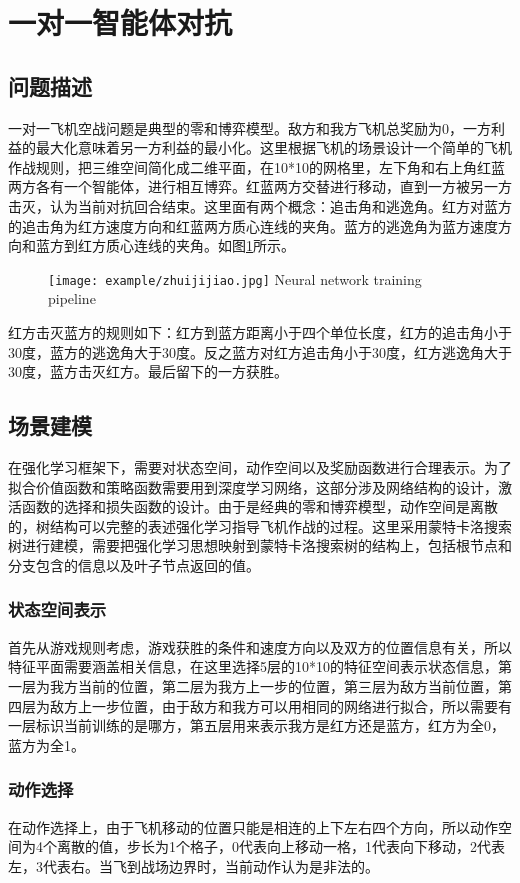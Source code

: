 \section{一对一智能体对抗}
\subsection{问题描述}
一对一飞机空战问题是典型的零和博弈模型。敌方和我方飞机总奖励为0，一方利益的最大化意味着另一方利益的最小化。这里根据飞机的场景设计一个简单的飞机作战规则，把三维空间简化成二维平面，在10*10的网格里，左下角和右上角红蓝两方各有一个智能体，进行相互博弈。红蓝两方交替进行移动，直到一方被另一方击灭，认为当前对抗回合结束。这里面有两个概念：追击角和逃逸角。红方对蓝方的追击角为红方速度方向和红蓝两方质心连线的夹角。蓝方的逃逸角为蓝方速度方向和蓝方到红方质心连线的夹角。如图\ref{fig:zhuijijiao}所示。
\begin{figure}[!htp]
	\centering
	\texttt{[image: example/zhuijijiao.jpg]}
	{Neural network training pipeline}
	\label{fig:zhuijijiao}
\end{figure}
红方击灭蓝方的规则如下：红方到蓝方距离小于四个单位长度，红方的追击角小于30度，蓝方的逃逸角大于30度。反之蓝方对红方追击角小于30度，红方逃逸角大于30度，蓝方击灭红方。最后留下的一方获胜。
\subsection{场景建模}
在强化学习框架下，需要对状态空间，动作空间以及奖励函数进行合理表示。为了拟合价值函数和策略函数需要用到深度学习网络，这部分涉及网络结构的设计，激活函数的选择和损失函数的设计。由于是经典的零和博弈模型，动作空间是离散的，树结构可以完整的表述强化学习指导飞机作战的过程。这里采用蒙特卡洛搜索树进行建模，需要把强化学习思想映射到蒙特卡洛搜索树的结构上，包括根节点和分支包含的信息以及叶子节点返回的值。
\subsubsection{状态空间表示}
首先从游戏规则考虑，游戏获胜的条件和速度方向以及双方的位置信息有关，所以特征平面需要涵盖相关信息，在这里选择5层的10*10的特征空间表示状态信息，第一层为我方当前的位置，第二层为我方上一步的位置，第三层为敌方当前位置，第四层为敌方上一步位置，由于敌方和我方可以用相同的网络进行拟合，所以需要有一层标识当前训练的是哪方，第五层用来表示我方是红方还是蓝方，红方为全0，蓝方为全1。
\subsubsection{动作选择}
在动作选择上，由于飞机移动的位置只能是相连的上下左右四个方向，所以动作空间为4个离散的值，步长为1个格子，0代表向上移动一格，1代表向下移动，2代表左，3代表右。当飞到战场边界时，当前动作认为是非法的。
